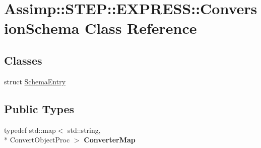 \hypertarget{class_assimp_1_1_s_t_e_p_1_1_e_x_p_r_e_s_s_1_1_conversion_schema}{\section{Assimp\+:\+:S\+T\+E\+P\+:\+:E\+X\+P\+R\+E\+S\+S\+:\+:Conversion\+Schema Class Reference}
\label{class_assimp_1_1_s_t_e_p_1_1_e_x_p_r_e_s_s_1_1_conversion_schema}
}
\subsection*{Classes}
\begin{DoxyCompactItemize}
\item 
struct \hyperlink{struct_assimp_1_1_s_t_e_p_1_1_e_x_p_r_e_s_s_1_1_conversion_schema_1_1_schema_entry}{Schema\+Entry}
\end{DoxyCompactItemize}
\subsection*{Public Types}
\begin{DoxyCompactItemize}
\item 
\hypertarget{class_assimp_1_1_s_t_e_p_1_1_e_x_p_r_e_s_s_1_1_conversion_schema_a767664def756f54a19768bcf5c143720}{typedef std\+::map$<$ std\+::string, \\*
Convert\+Object\+Proc $>$ {\bfseries Converter\+Map}}\label{class_assimp_1_1_s_t_e_p_1_1_e_x_p_r_e_s_s_1_1_conversion_schema_a767664def756f54a19768bcf5c143720}

\end{DoxyCompactItemize}
